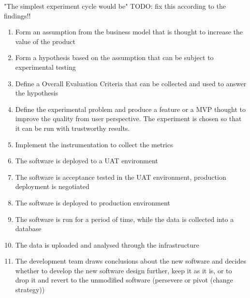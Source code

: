 \documentclass[english]{tktltiki2}
\theoremstyle{definition}
\theoremstyle{remark}
\begin{document}
"The simplest experiment cycle would be" \cite{eklund2012architecture} TODO: fix this according to the findings!!
\begin{enumerate}
  \item Form an assumption from the business model that is thought to increase the value of the product
  \item Form a hypothesis based on the assumption that can be subject to experimental testing 
  \item Define a Overall Evaluation Criteria that can be collected and used to answer the hypothesis  
  \item Define the experimental problem and produce a feature or a MVP thought to improve the quality from user perspective. The experiment is chosen so that it can be run with trustworthy results. 

  \item Implement the instrumentation to collect the metrics 


  \item The software is deployed to a UAT environment %
  \item The software is acceptance tested in the UAT environment, production deployment is negotiated
  \item The software is deployed to production environment
  \item The software is run for a period of time, while the data is collected into a database
  
  \item The data is uploaded and analysed through the infrastructure
  \item The development team draws conclusions about the new software and decides whether to develop the new software design further, keep it as it is, or to drop it and revert to the unmodified software (persevere or pivot (change strategy))
\end{enumerate}
\end{document}
